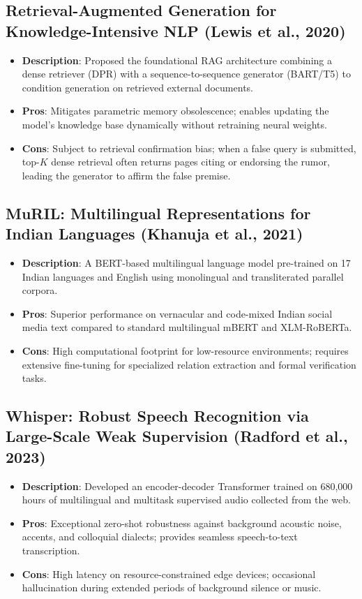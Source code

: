 \documentclass[12pt,a4paper]{report}
\begin{document}
\subsection{Retrieval-Augmented Generation for Knowledge-Intensive NLP (Lewis et al., 2020)}
\begin{itemize}
    \item \textbf{Description}: Proposed the foundational RAG architecture combining a dense retriever (DPR) with a sequence-to-sequence generator (BART/T5) to condition generation on retrieved external documents.
    \item \textbf{Pros}: Mitigates parametric memory obsolescence; enables updating the model's knowledge base dynamically without retraining neural weights.
    \item \textbf{Cons}: Subject to retrieval confirmation bias; when a false query is submitted, top-$K$ dense retrieval often returns pages citing or endorsing the rumor, leading the generator to affirm the false premise.
\end{itemize}

\subsection{MuRIL: Multilingual Representations for Indian Languages (Khanuja et al., 2021)}
\begin{itemize}
    \item \textbf{Description}: A BERT-based multilingual language model pre-trained on 17 Indian languages and English using monolingual and transliterated parallel corpora.
    \item \textbf{Pros}: Superior performance on vernacular and code-mixed Indian social media text compared to standard multilingual mBERT and XLM-RoBERTa.
    \item \textbf{Cons}: High computational footprint for low-resource environments; requires extensive fine-tuning for specialized relation extraction and formal verification tasks.
\end{itemize}

\subsection{Whisper: Robust Speech Recognition via Large-Scale Weak Supervision (Radford et al., 2023)}
\begin{itemize}
    \item \textbf{Description}: Developed an encoder-decoder Transformer trained on 680,000 hours of multilingual and multitask supervised audio collected from the web.
    \item \textbf{Pros}: Exceptional zero-shot robustness against background acoustic noise, accents, and colloquial dialects; provides seamless speech-to-text transcription.
    \item \textbf{Cons}: High latency on resource-constrained edge devices; occasional hallucination during extended periods of background silence or music.
\end{itemize}
\end{document}
